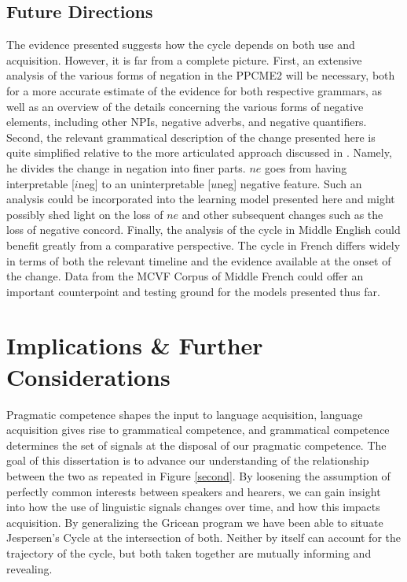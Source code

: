 \documentclass[12pt]{article}
\theoremstyle{definition} \newtheorem{definition}{Definition}
\begin{document}
\subsection{Future Directions}

The evidence presented suggests how the cycle depends on both use and acquisition. However, it is far from a complete picture. First, an extensive analysis of the various forms of negation in the PPCME2 will be necessary, both for a more accurate estimate of the evidence for both respective grammars, as well as an overview of the details concerning the various forms of negative elements, including other NPIs, negative adverbs, and negative quantifiers. Second, the relevant grammatical description of the change presented here is quite simplified relative to the more articulated approach discussed in \cite{wallage2008}. Namely, he divides the change in negation into finer parts. $ne$ goes from having interpretable [$i$neg] to an uninterpretable [$u$neg] negative feature. Such an analysis could be incorporated into the learning model presented here and might possibly shed light on the loss of $ne$ and other subsequent changes such as the loss of negative concord. Finally, the analysis of the cycle in Middle 
English could benefit greatly from a comparative perspective. The cycle in French differs widely in terms of both the relevant timeline and the evidence available at the onset of the change. Data from the MCVF Corpus of Middle French \citep{mcvf} could offer an important counterpoint and testing ground for the models presented thus far.

\section{Implications \& Further Considerations}

Pragmatic competence shapes the input to language acquisition, language acquisition gives rise to grammatical competence, and grammatical competence determines the set of signals at the disposal of our pragmatic competence. The goal of this dissertation is to advance our understanding of the relationship between the two as repeated in Figure \ref{second}. By loosening the assumption of perfectly common interests between speakers and hearers, we can gain insight into how the use of linguistic signals changes over time, and how this impacts acquisition. By generalizing the Gricean program we have been able to situate Jespersen's Cycle at the intersection of both. Neither by itself can account for the trajectory of the cycle, but both taken together are mutually informing and revealing.
\end{document}
